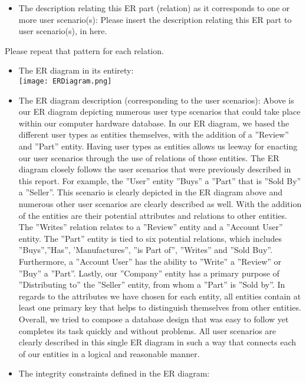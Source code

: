 {\begin{itemize}
\\
\texttt{[image: ispartofrelation.png]}
\\
\item{ The description relating this ER part (relation) as it corresponds to one or more user scenario(s): }
Please insert the description relating this ER part to user scenario(s), in here.
\end{itemize}
Please repeat that pattern for each relation.
\begin{itemize} 
\item{ The ER diagram in its entirety: }
\\
\texttt{[image: ERDiagram.png]}
\item{ The ER diagram description (corresponding to the user scenarios): }
Above is our ER diagram depicting numerous user type scenarios that could take place within our computer hardware database. In our ER diagram, we based the different user types as entities themselves, with the addition of a ''Review'' and ''Part'' entity. Having user types as entities allows us leeway for enacting our user scenarios through the use of relations of those entities. The ER diagram closely follows the user scenarios that were previously described in this report. For example, the ''User'' entity ''Buys'' a ''Part'' that is ''Sold By'' a ''Seller''. This scenario is clearly depicted in the ER diagram above and numerous other user scenarios are clearly described as well. With the addition of the entities are their potential attributes and relations to other entities. The ''Writes'' relation relates to a ''Review'' entity and a ''Account User'' entity. The ''Part'' entity is tied to six potential relations, which includes ''Buys'',''Has'', 'Manufactures'', ''is Part of'', ''Writes'' and ''Sold Buy''. Furthermore, a ''Account User'' has the ability to ''Write'' a ''Review'' or ''Buy'' a ''Part''. Lastly, our ''Company'' entity has a primary purpose of ''Distributing to'' the ''Seller'' entity, from whom a ''Part'' is ''Sold by''. In regards to the attributes we have chosen for each entity, all entities contain at least one primary key that helps to distinguish themselves from other entities. Overall, we tried to compose a database design that was easy to follow yet completes its task quickly and without problems. All user scenarios are clearly described in this single ER diagram in such a way that connects each of our entities in a logical and reasonable manner.
\\
\item{ The integrity constraints defined in the ER diagram: }

\end{itemize}}
